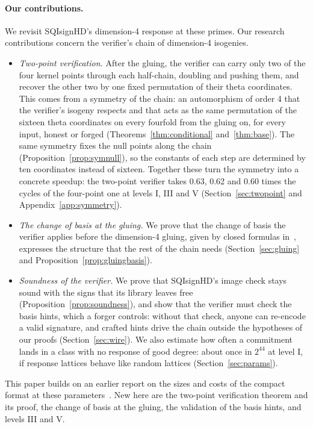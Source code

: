 \documentclass[version=preprint]{iacrcc}
\begin{document}
    \paragraph{Our contributions.}
    We revisit SQIsignHD's dimension-4 response at these primes. Our research
    contributions concern the verifier's chain of dimension-4 isogenies.
    \begin{itemize}
        \item \emph{Two-point verification.} After the gluing, the verifier
        can carry only two of the four kernel points through each half-chain,
        doubling and pushing them, and recover the other two by one fixed
        permutation of their theta coordinates. This comes from a symmetry of
        the chain: an automorphism of order 4 that the verifier's isogeny
        respects and that acts as the same permutation of the sixteen theta
        coordinates on every fourfold from the gluing on, for every input,
        honest or forged (Theorems~\ref{thm:conditional}
        and~\ref{thm:base}). The same symmetry fixes the null points along the
        chain (Proposition~\ref{prop:symnull}), so the constants of each step
        are determined by ten coordinates instead of sixteen. Together these
        turn the symmetry into a concrete speedup: the two-point verifier takes
        0.63, 0.62 and 0.60 times the cycles of the four-point one at levels I,
        III and V (Section~\ref{sec:twopoint} and
        Appendix~\ref{app:symmetry}).
        \item \emph{The change of basis at the gluing.} We prove that the
        change of basis the verifier applies before the dimension-4 gluing,
        given by closed formulas in~\cite{Dar24}, expresses the structure that
        the rest of the chain needs (Section~\ref{sec:gluing} and
        Proposition~\ref{prop:gluingbasis}).
        \item \emph{Soundness of the verifier.} We prove that SQIsignHD's
        image check stays sound with the signs that its library leaves free
        (Proposition~\ref{prop:soundness}), and show that the verifier must
        check the basis hints, which a forger controls: without that check,
        anyone can re-encode a valid signature, and crafted hints drive the
        chain outside the hypotheses of our proofs (Section~\ref{sec:wire}). We
        also estimate how often a commitment lands in a class with no response
        of good degree: about once in $2^{44}$ at level I, if response lattices
        behave like random lattices (Section~\ref{sec:params}).
    \end{itemize}
    This paper builds on an earlier report on the sizes and costs of the
    compact format at these parameters~\cite{Ray26d}. New here are the
    two-point verification theorem and its proof, the change of basis at the
    gluing, the validation of the basis hints, and levels III and V.
\end{document}
